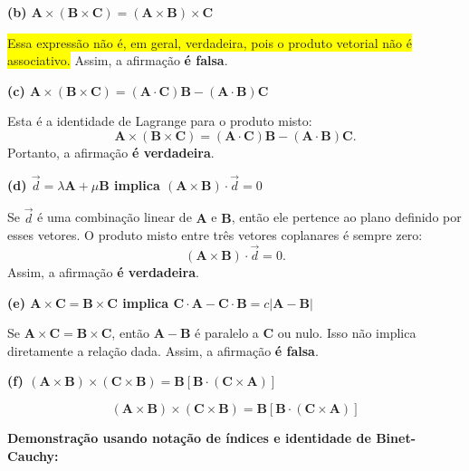 \documentclass[a4paper,12pt]{article}
\begin{document}
\begin{flushleft}
\textbf{(b) $\mathbf{A} \times (\mathbf{B} \times \mathbf{C}) = (\mathbf{A} \times \mathbf{B}) \times \mathbf{C}$}

\colorbox{yellow}{Essa expressão não é, em geral, verdadeira, pois o produto vetorial não é associativo.} 
Assim, a afirmação \colorbox{red!20}{\textbf{é falsa}.}

\textbf{(c) $\mathbf{A} \times (\mathbf{B} \times \mathbf{C}) = (\mathbf{A} \cdot \mathbf{C}) \mathbf{B} - (\mathbf{A} \cdot \mathbf{B}) \mathbf{C}$}

Esta é a identidade de Lagrange para o produto misto:
\begin{equation}
    \mathbf{A} \times (\mathbf{B} \times \mathbf{C}) = (\mathbf{A} \cdot \mathbf{C})\mathbf{B} - (\mathbf{A} \cdot \mathbf{B})\mathbf{C}.
\end{equation}
Portanto, a afirmação \colorbox{green!30}{\textbf{é verdadeira}.}

\textbf{(d) $\vec{d} = \lambda \mathbf{A} + \mu \mathbf{B}$ implica $(\mathbf{A} \times \mathbf{B}) \cdot \vec{d} = 0$}

Se $\vec{d}$ é uma combinação linear de $\mathbf{A}$ e $\mathbf{B}$, então ele pertence ao plano definido por esses vetores. O produto misto entre três vetores coplanares é sempre zero:
\begin{equation}
    (\mathbf{A} \times \mathbf{B}) \cdot \vec{d} = 0.
\end{equation}
Assim, a afirmação \colorbox{green!30}{\textbf{é verdadeira}.}

\textbf{(e) $\mathbf{A} \times \mathbf{C} = \mathbf{B} \times \mathbf{C}$ implica $\mathbf{C} \cdot \mathbf{A} - \mathbf{C} \cdot \mathbf{B} = c|\mathbf{A} - \mathbf{B}|$}

Se $\mathbf{A} \times \mathbf{C} = \mathbf{B} \times \mathbf{C}$, então $\mathbf{A} - \mathbf{B}$ é paralelo a $\mathbf{C}$ ou nulo. 
Isso não implica diretamente a relação dada. Assim, a afirmação \colorbox{red!20}{\textbf{é falsa}.}

\textbf{(f) $(\mathbf{A} \times \mathbf{B}) \times (\mathbf{C} \times \mathbf{B}) = \mathbf{B} [\mathbf{B} \cdot (\mathbf{C} \times \mathbf{A})]$}

\begin{equation}
(\mathbf{A} \times \mathbf{B}) \times (\mathbf{C} \times \mathbf{B}) = \mathbf{B} \left[\mathbf{B} \cdot (\mathbf{C} \times \mathbf{A})\right]
\end{equation}

\textbf{Demonstração usando notação de índices e identidade de Binet-Cauchy:}


\end{flushleft}
\end{document}

